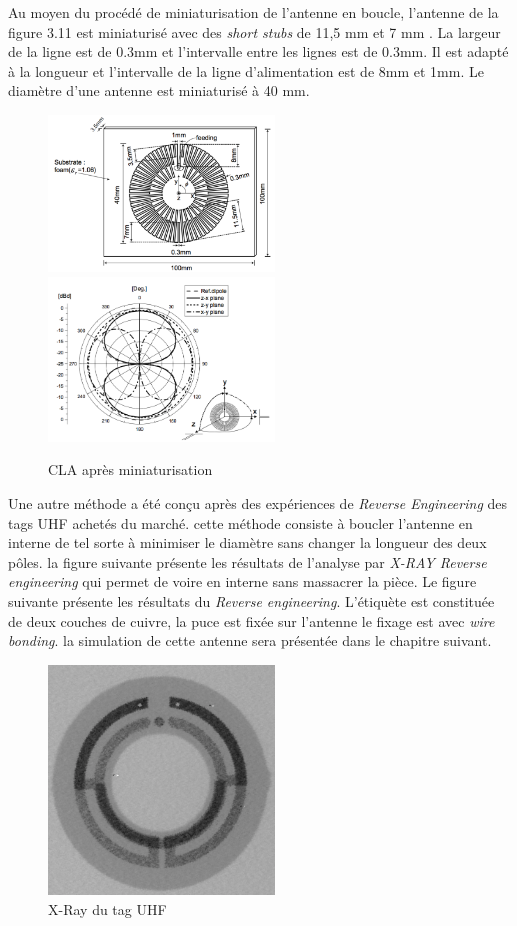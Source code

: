 \documentclass[11pt, a4paper, twoside]{book}
\begin{document}
Au moyen du procédé de miniaturisation de l'antenne en boucle, l'antenne de la figure 3.11 est miniaturisé avec des \emph{short stubs} de 11,5 mm et 7 mm . La largeur de la ligne est de 0.3mm et l'intervalle entre les lignes est de 0.3mm. Il est adapté à la longueur et l'intervalle de la ligne d'alimentation est de 8mm et 1mm. Le diamètre d'une antenne est miniaturisé à 40 mm.\\
\begin{figure}[H]
\centering
\includegraphics[width=6cm]{structure}
\includegraphics[width=6cm]{structurea}
\caption{CLA après miniaturisation}
\end{figure}

Une autre méthode a été conçu après des expériences de \emph{Reverse Engineering} des tags UHF achetés du marché. cette méthode consiste à boucler l'antenne en interne de tel sorte à minimiser le diamètre sans changer la longueur des deux pôles. la figure suivante présente les résultats de l'analyse par  \emph{X-RAY Reverse engineering} qui permet de voire en interne sans massacrer la pièce. Le figure suivante présente les résultats du \emph{Reverse engineering}. L'étiquète est constituée de deux couches de cuivre, la puce est fixée sur l'antenne le fixage est avec \emph{wire bonding}. la simulation de cette antenne sera présentée dans le chapitre suivant. \\

\begin{figure}[H]
\centering
\includegraphics[width=6cm]{xray}
\caption{X-Ray du tag UHF}
\end{figure}
\end{document}
